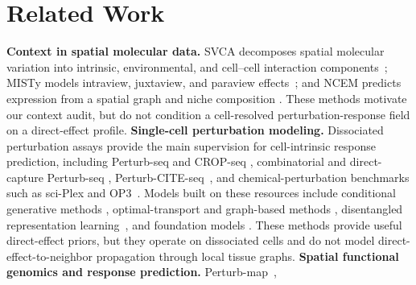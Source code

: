\documentclass[sigconf,review,balance=false]{acmart}
\newcommand{\methodname}{\textsc{Spine}\xspace}
\begin{document}
\section{Related Work}
\textbf{Context in spatial molecular data.}
SVCA decomposes spatial molecular variation into intrinsic, environmental, and
cell--cell interaction components~\citep{arnol2019svca}; MISTy models
intraview, juxtaview, and paraview effects~\citep{tanevski2022misty}; and NCEM
predicts expression from a spatial graph and niche composition
\citep{fischer2023ncem}. These methods motivate our context audit, but do not
condition a cell-resolved perturbation-response field on a direct-effect
profile.
\textbf{Single-cell perturbation modeling.}
Dissociated perturbation assays provide the main supervision for cell-intrinsic
response prediction, including Perturb-seq and CROP-seq
\citep{dixit2016perturbseq,adamson2016crispr,datlinger2017cropsseq}, combinatorial
and direct-capture Perturb-seq
\citep{norman2019combinatorial,replogle2020directcapture,replogle2022mapping},
Perturb-CITE-seq~\citep{frangieh2021multimodal}, and chemical-perturbation
benchmarks such as sci-Plex and OP3~\citep{srivatsan2020massively,szalata2024op3}.
Models built on these resources include conditional generative methods
\citep{lotfollahi2019scgen,lotfollahi2020trvae,Lotfollahi2023,hetzel2022chemcpa,kana2023scvidr,yu2025perturbnet},
optimal-transport and graph-based methods \citep{bunne2023cellot,roohani2023gears},
disentangled representation learning~\citep{piran2024biolord}, and foundation
models \citep{theodoris2023geneformer,cui2024scgpt,hao2024scfoundation}. These
methods provide useful direct-effect priors, but they operate on dissociated cells
and do not model direct-effect-to-neighbor propagation through local tissue graphs.
\textbf{Spatial functional genomics and response prediction.}
Perturb-map~\citep{dhainaut2022spatialcrispr},
\end{document}
